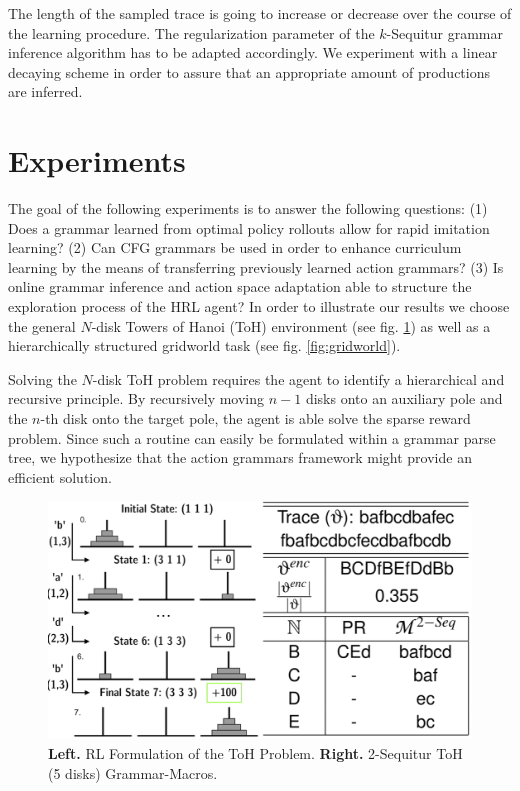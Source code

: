 \documentclass[10pt,letterpaper]{article}
\begin{document}
The length of the sampled trace is going to increase or decrease over the course of the learning procedure. The regularization parameter of the $k$-Sequitur grammar inference algorithm has to be adapted accordingly. We experiment with a linear decaying scheme in order to assure that an appropriate amount of productions are inferred.

\section{Experiments}

The goal of the following experiments is to answer the following questions: (1) Does a grammar learned from optimal policy rollouts allow for rapid imitation learning? (2) Can CFG grammars be used in order to enhance curriculum learning by the means of transferring previously learned action grammars? (3) Is online grammar inference and action space adaptation able to structure the exploration process of the HRL agent?
In order to illustrate our results we choose the general $N$-disk Towers of Hanoi (ToH) environment (see fig. \ref{fig:hanoi}) as well as a hierarchically structured gridworld task (see fig. \ref{fig:gridworld}).

Solving the $N$-disk ToH problem requires the agent to identify a hierarchical and recursive principle. By recursively moving $n-1$ disks onto an auxiliary pole and the $n$-th disk onto the target pole, the agent is able solve the sparse reward problem. Since such a routine can easily be formulated within a grammar parse tree, we hypothesize that the action grammars framework might provide an efficient solution.


\begin{figure}[H]
    \centering
    \includegraphics[width=\linewidth]{figures/hanoi_grammar.png}
    \caption{\textbf{Left.} RL Formulation of the ToH Problem. \textbf{Right.} 2-Sequitur ToH (5 disks) Grammar-Macros.}
    \label{fig:hanoi}
 \end{figure}
 
\end{document}
